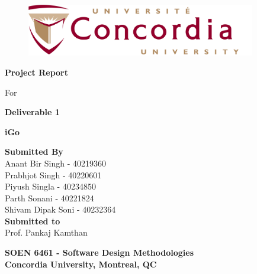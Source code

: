 \documentclass[a4paper,12pt]{article}
\begin{document}
\begin{titlepage}

\begin{center}
\vspace*{-1.2in}
\begin{figure}[htb]
\begin{center}
\includegraphics[width=10cm]{Concordia_logo.png}
\end{center}
\end{figure}
\begin{Large}
\vspace*{0.3in}
\textbf{Project Report} \\
\end{Large}
\vspace*{0.1in}
\begin{Large}
For\\
\end{Large}
\vspace*{0.1in}

\begin{Large}
\textbf{Deliverable 1} \\
\end{Large}
\vspace*{0.1in}

\begin{Large}
\textbf{iGo} \\
\end{Large}
\vspace*{0.3in}

\begin{large}
\textbf{Submitted By} \\
\vspace*{0.1in}
Anant Bir Singh - 40219360\\
Prabhjot Singh - 40220601\\
Piyush Singla - 40234850\\
Parth Sonani - 40221824\\
Shivam Dipak Soni - 40232364 \\
\vspace*{0.2in}
\textbf{Submitted to}\\
\vspace*{0.1in}
Prof. Pankaj Kamthan\\
\vspace*{0.3in}

\begin{Large}
\textbf{SOEN 6461 - Software Design Methodologies} \\
\vspace*{0.2in}
\textbf{Concordia University, Montreal, QC}
\end{Large}

\end{large}
\end{center}
\end{titlepage}
\end{document}
